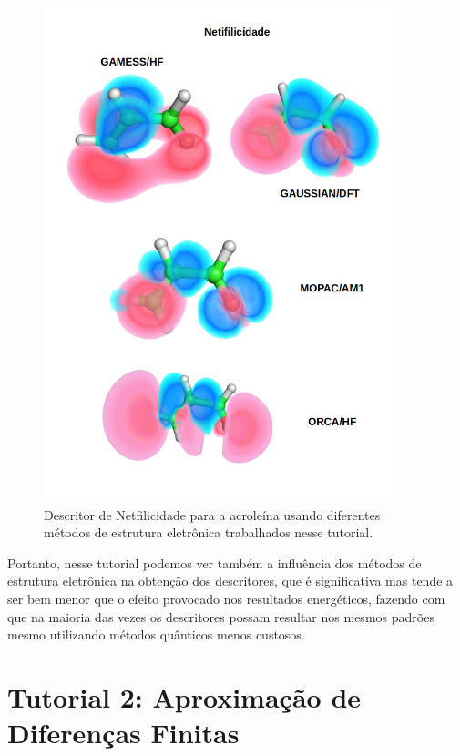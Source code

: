 \documentclass[a4paper,11pt]{refart}
\begin{document}
\hspace*{-\leftmarginwidth}
\begin{minipage}{\fullwidth}
\begin{figure}[H]
\begin{center}
\includegraphics[width=4in]{images/img11}
\caption{Descritor de Netfilicidade para a acroleína usando diferentes métodos de estrutura eletrônica trabalhados nesse tutorial.}
\label{fig_tut1_10}
\end{center}
\end{figure}
\end{minipage}

Portanto, nesse tutorial podemos ver também a influência dos métodos de estrutura eletrônica na obtenção dos descritores, que é significativa mas tende a ser bem menor que o efeito provocado nos resultados energéticos, fazendo com que na maioria das vezes os descritores possam resultar nos mesmos padrões mesmo utilizando métodos quânticos menos custosos. 

\newpage
\section{Tutorial 2: Aproximação de Diferenças Finitas}
\end{document}
